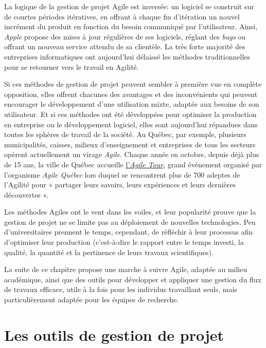 \documentclass[
  letterpaper,
  DIV=11,
  numbers=noendperiod]{scrreprt}
\begin{document}
La logique de la gestion de projet Agile est inversée: un logiciel se
construit sur de courtes périodes itératives, en offrant à chaque fin
d'itération un nouvel incrément du produit en fonction du besoin
communiqué par l'utilisateur. Ainsi, \emph{Apple} propose des mises à
jour régulières de ses logiciels, réglant des \emph{bugs} ou offrant un
nouveau service attendu de sa clientèle. La très forte majorité des
entreprises informatiques ont aujourd'hui délaissé les méthodes
traditionnelles pour se retourner vers le travail en Agilité.

Si ces méthodes de gestion de projet peuvent sembler à première vue en
complète opposition, elles offrent chacunes des avantages et des
inconvénients qui peuvent encourager le développement d'une utilisation
mixte, adaptée aux besoins de son utilisateur. Et si ces méthodes ont
été développées pour optimiser la production en entreprise ou le
développement logiciel, elles sont aujourd'hui répandues dans toutes les
sphères de travail de la société. Au Québec, par exemple, plusieurs
municipalités, caisses, milieux d'enseignement et entreprises de tous
les secteurs opèrent actuellement un virage \emph{Agile}. Chaque année
en octobre, depuis déjà plus de 15 ans, la ville de Québec accueille
\href{https://www.agilequebec.ca/fr/}{l'\emph{Agile Tour}}, grand
évènement organisé par l'organisme \emph{Agile Québec} lors duquel se
rencontrent plus de 700 adeptes de l'Agilité pour « partager leurs
savoirs, leurs expériences et leurs dernières découvertes ».

Les méthodes Agiles ont le vent dans les voiles, et leur popularité
prouve que la gestion de projet ne se limite pas au déploiement de
nouvelles technologies. Peu d'universitaires prennent le temps,
cependant, de réfléchir à leur processus afin d'optimiser leur
production (c'est-à-dire le rapport entre le temps investi, la qualité,
la quantité et la pertinence de leurs travaux scientifiques).

La suite de ce chapitre propose une marche à suivre Agile, adaptée au
milieu académique, ainsi que des outils pour développer et appliquer une
gestion du flux de travaux efficace, utile à la fois pour les individus
travaillant seuls, mais particulièrement adaptée pour les équipes de
recherche.

\section{Les outils de gestion de
projet}\label{les-outils-de-gestion-de-projet}
\end{document}
